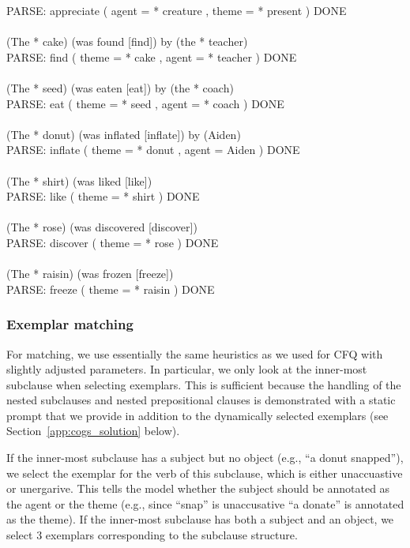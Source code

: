 \documentclass{article} \usepackage{iclr2022_conference,times}
\begin{document}
{PARSE: appreciate ( agent = * creature , theme = * present ) DONE \\
 \\
(The * cake) (was found [find]) by (the * teacher) \\
PARSE: find ( theme = * cake , agent = * teacher ) DONE \\
 \\
(The * seed) (was eaten [eat]) by (the * coach) \\
PARSE: eat ( theme = * seed , agent = * coach ) DONE \\
 \\
(The * donut) (was inflated [inflate]) by (Aiden) \\
PARSE: inflate ( theme = * donut , agent = Aiden ) DONE \\
 \\
(The * shirt) (was liked [like]) \\
PARSE: like ( theme = * shirt ) DONE \\
 \\
(The * rose) (was discovered [discover]) \\
PARSE: discover ( theme = * rose ) DONE \\
 \\
(The * raisin) (was frozen [freeze]) \\
PARSE: freeze ( theme = * raisin ) DONE
}


\subsubsection{Exemplar matching}
\label{app:cogs_exemplar_selection_matching}
For matching, we use essentially the same heuristics as we used for CFQ with slightly adjusted parameters. In particular, we only look at the inner-most subclause when selecting exemplars. This is sufficient because the handling of the nested subclauses and nested prepositional clauses is demonstrated with a static prompt that we provide in addition to the dynamically selected exemplars (see Section~\ref{app:cogs_solution} below).

If the inner-most subclause has a subject but no object (e.g., ``a donut snapped''), we select the exemplar for the verb of this subclause, which is either unaccuastive or unergarive. This tells the model whether the subject should be annotated as the agent or the theme (e.g., since ``snap'' is unaccusative ``a donate'' is annotated as the theme). If the inner-most subclause has both a subject and an object, we select 3 exemplars corresponding to the subclause structure.
\end{document}
